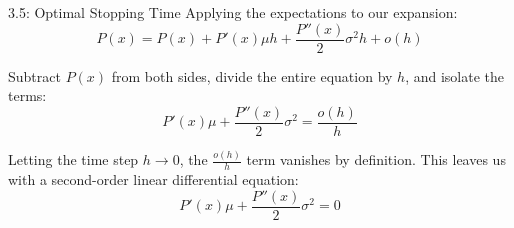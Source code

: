 \documentclass{beamer}
\begin{document}
	\begin{frame}{3.5: Optimal Stopping Time}
		Applying the expectations to our expansion:
		$$P(x) = P(x) + P'(x)\mu h + \frac{P''(x)}{2}\sigma^2h + o(h)$$
		
		\vspace{0.3cm}
		Subtract $P(x)$ from both sides, divide the entire equation by $h$, and isolate the terms:
		$$P'(x)\mu + \frac{P''(x)}{2}\sigma^2 = \frac{o(h)}{h}$$
		
		\vspace{0.3cm}
		Letting the time step $h \to 0$, the $\frac{o(h)}{h}$ term vanishes by definition. This leaves us with a second-order linear differential equation:
		$$P'(x)\mu + \frac{P''(x)}{2}\sigma^2 = 0$$
	\end{frame}
	
\end{document}
